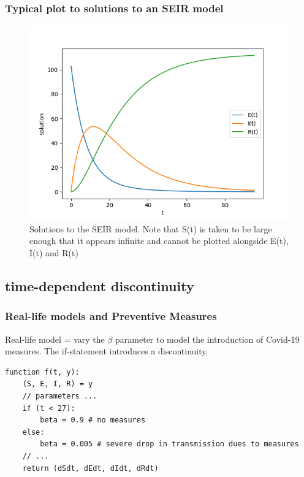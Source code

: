 \documentclass{beamer}
\begin{document}
\begin{frame}
\frametitle{Typical plot to solutions to an SEIR model}
\begin{figure}[H]
\centering
\includegraphics[width=0.7\linewidth]{./figures/SEIR}
\caption{Solutions to the SEIR model. Note that S(t) is taken to be large enough that it appears infinite and cannot be plotted alongside E(t), I(t) and R(t)}
\label{fig:SEIR}
\end{figure}
\end{frame}

\subsection{time-dependent discontinuity}
\begin{frame}[fragile]
\frametitle{Real-life models and Preventive Measures}
Real-life model = vary the $\beta$ parameter to model the introduction of Covid-19 measures.
The if-statement introduces a discontinuity.
\begin{lstlisting}
function f(t, y):
    (S, E, I, R) = y
    // parameters ...
    if (t < 27): 
        beta = 0.9 # no measures
    else: 
        beta = 0.005 # severe drop in transmission dues to measures
    // ...
    return (dSdt, dEdt, dIdt, dRdt)
\end{lstlisting}
\end{frame}
\end{document}
